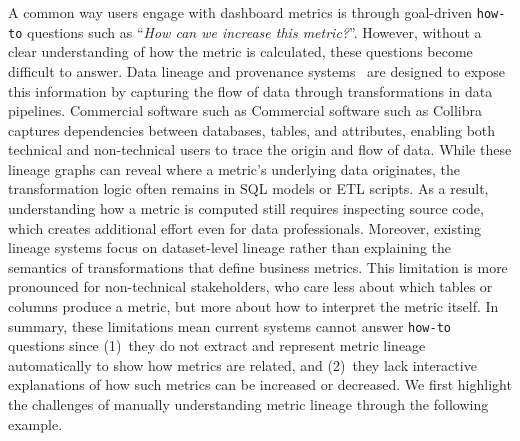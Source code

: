  A common way users engage with dashboard metrics is through goal-driven
 \texttt{how-to} questions such as ``\textit{How can we increase this
 metric?}''. However, without a clear understanding of how the metric is
 calculated, these questions become difficult to answer. Data lineage and
 provenance systems~\cite{galhotra2022hyper, DBLP:conf/sigmod/MeliouS12} are
 designed to expose this information by capturing the flow of data through
 transformations in data pipelines. Commercial software such as
Commercial software such as Collibra~\cite{collibra}
 captures dependencies between databases, tables, and attributes, enabling both
 technical and non-technical users to trace the origin and flow of data. While
 these lineage graphs can reveal where a metric's underlying data originates,
 the transformation logic often remains in SQL models or ETL scripts. As a
 result, understanding how a metric is computed still requires inspecting source
 code, which creates additional effort even for data professionals. Moreover,
 existing lineage systems focus on dataset-level lineage rather than explaining
 the semantics of transformations that define business metrics. This limitation
 is more pronounced for non-technical stakeholders, who care less about which
 tables or columns produce a metric, but more about how to interpret the metric
 itself. 
%
In summary, these limitations mean current systems cannot answer \texttt{how-to}
questions since (1)~they do not extract and represent metric lineage
automatically to show how metrics are related, and (2)~they lack interactive
explanations of how such metrics can be increased or decreased.
% 
We first highlight the challenges of manually understanding metric lineage
through the following example.



